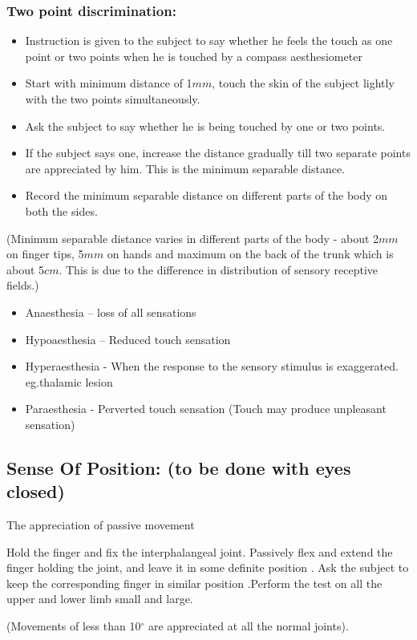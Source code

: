 \documentclass[a4paper,12pt,openany,oneside]{book}
\begin{document}
\subsubsection*{Two point discrimination:}
\begin{itemize}
\item{Instruction is given to the subject to say whether he feels the touch as one point or two points when he is touched by a compass aesthesiometer}
\item{Start with minimum distance of 1$mm$, touch the skin of the subject lightly with the two points simultaneously.}
\item{Ask the subject to say whether he is being touched by one or two points.}
\item{If the subject says one, increase the distance gradually till two separate points are appreciated by him. This is the minimum separable distance.}
\item{Record the minimum separable distance on different parts of the body on both the sides.}
\end{itemize}
\par
(Minimum separable distance varies in different parts of the body - about 2$mm$ on finger tips, 5$mm$ on hands and maximum on the back of the trunk which is about 5$cm$. This is due to the difference in distribution of sensory receptive fields.)
\begin{itemize}
\item[]Anaesthesia 	– loss of all sensations
\item[]Hypoaesthesia 	– Reduced touch sensation
\item[]Hyperaesthesia 	- When the response to the sensory stimulus is exaggerated.  eg.thalamic lesion
\item[]Paraesthesia 	- Perverted touch sensation (Touch may produce unpleasant 				sensation)
\end{itemize}

\subsection*{Sense Of Position: (to be done with eyes closed)}
\par
The appreciation of passive movement
\par
	Hold the finger and fix the interphalangeal joint. Passively flex and extend the finger holding the joint, and leave it in some definite position . Ask the subject to keep the corresponding finger in similar position .Perform the test on all the upper and lower limb small and large.
	\par
(Movements of less than 10${^\circ}$ are appreciated at all the normal joints).
\end{document}
